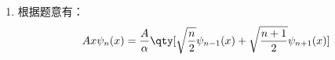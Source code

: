 
\subsection{ }
\begin{enumerate}
\item 根据题意有：
\begin{equation}
Ax\psi_n(x)=\frac{A}{\alpha}\qty[\sqrt{\frac{n}{2}}\psi_{n-1}(x)+\sqrt{\frac{n+1}{2}}\psi_{n+1}(x) ] 
\end{equation}
\end{enumerate}